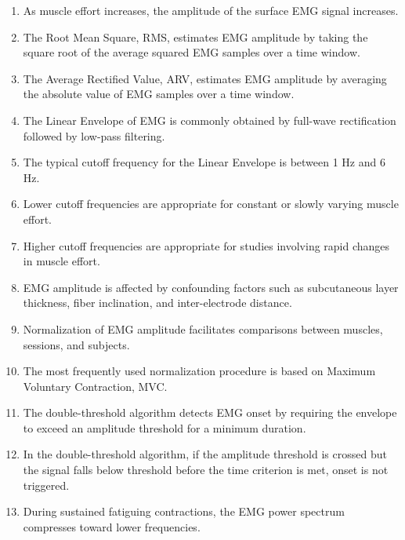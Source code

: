 \begin{enumerate}[label=\arabic*.]
    \item As muscle effort increases, the amplitude of the surface EMG signal increases.
    
    \item The Root Mean Square, RMS, estimates EMG amplitude by taking the square root of the average squared EMG samples over a time window.
    
    \item The Average Rectified Value, ARV, estimates EMG amplitude by averaging the absolute value of EMG samples over a time window.
    
    \item The Linear Envelope of EMG is commonly obtained by full-wave rectification followed by low-pass filtering.
    
    \item The typical cutoff frequency for the Linear Envelope is between 1 Hz and 6 Hz.
    
    \item Lower cutoff frequencies are appropriate for constant or slowly varying muscle effort.
    
    \item Higher cutoff frequencies are appropriate for studies involving rapid changes in muscle effort.
    
    \item EMG amplitude is affected by confounding factors such as subcutaneous layer thickness, fiber inclination, and inter-electrode distance.
    
    \item Normalization of EMG amplitude facilitates comparisons between muscles, sessions, and subjects.
    
    \item The most frequently used normalization procedure is based on Maximum Voluntary Contraction, MVC.
    
    \item The double-threshold algorithm detects EMG onset by requiring the envelope to exceed an amplitude threshold for a minimum duration.
    
    \item In the double-threshold algorithm, if the amplitude threshold is crossed but the signal falls below threshold before the time criterion is met, onset is not triggered.
    
    \item During sustained fatiguing contractions, the EMG power spectrum compresses toward lower frequencies.
    

\end{enumerate}
